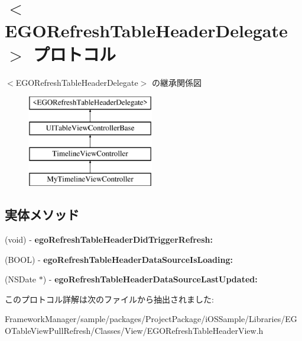 \hypertarget{protocol_e_g_o_refresh_table_header_delegate-p}{}\section{$<$E\+G\+O\+Refresh\+Table\+Header\+Delegate$>$ プロトコル}
\label{protocol_e_g_o_refresh_table_header_delegate-p}
$<$E\+G\+O\+Refresh\+Table\+Header\+Delegate$>$ の継承関係図\begin{figure}[H]
\begin{center}
\leavevmode
\includegraphics[height=4.000000cm]{protocol_e_g_o_refresh_table_header_delegate-p}
\end{center}
\end{figure}
\subsection*{実体メソッド}
\begin{DoxyCompactItemize}
\item 
\hypertarget{protocol_e_g_o_refresh_table_header_delegate-p_a3a71311636e9d10813ffeabe19d6adb7}{}(void) -\/ {\bfseries ego\+Refresh\+Table\+Header\+Did\+Trigger\+Refresh\+:}\label{protocol_e_g_o_refresh_table_header_delegate-p_a3a71311636e9d10813ffeabe19d6adb7}

\item 
\hypertarget{protocol_e_g_o_refresh_table_header_delegate-p_a6e51969fde015d59e9314a4ec41c21b8}{}(B\+O\+O\+L) -\/ {\bfseries ego\+Refresh\+Table\+Header\+Data\+Source\+Is\+Loading\+:}\label{protocol_e_g_o_refresh_table_header_delegate-p_a6e51969fde015d59e9314a4ec41c21b8}

\item 
\hypertarget{protocol_e_g_o_refresh_table_header_delegate-p_aaa03c7c1a490ebb17fcff24f7f1c5d35}{}(N\+S\+Date $\ast$) -\/ {\bfseries ego\+Refresh\+Table\+Header\+Data\+Source\+Last\+Updated\+:}\label{protocol_e_g_o_refresh_table_header_delegate-p_aaa03c7c1a490ebb17fcff24f7f1c5d35}

\end{DoxyCompactItemize}


このプロトコル詳解は次のファイルから抽出されました\+:\begin{DoxyCompactItemize}
\item 
Framework\+Manager/sample/packages/\+Project\+Package/i\+O\+S\+Sample/\+Libraries/\+E\+G\+O\+Table\+View\+Pull\+Refresh/\+Classes/\+View/E\+G\+O\+Refresh\+Table\+Header\+View.\+h\end{DoxyCompactItemize}
